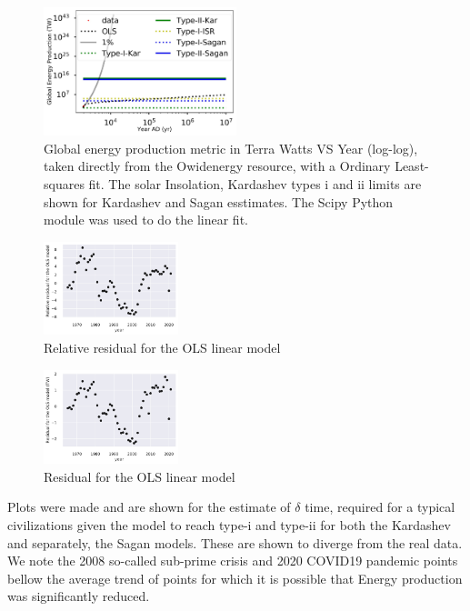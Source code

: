 \documentclass[final,5p,times,twocolumn,authoryear]{elsarticle}
\begin{document}
\begin{figure}
    \centering
    \includegraphics[width=0.5\textwidth]{figs/fig2_kar.jpg}
    \caption{Global energy production metric in Terra Watts VS Year (log-log), taken directly from the Owidenergy resource, with a Ordinary Least-squares fit. The solar Insolation, Kardashev types i and ii limits are shown for Kardashev and Sagan esstimates. The Scipy Python module was used to do the linear fit.}
    \label{fig:kardashev3}

\end{figure}

\begin{figure}
    \centering
    \includegraphics[width=0.35\textwidth]{figs/fig1p_kar_rel_res.jpg}
    \caption{Relative residual for the OLS
    linear model}
    \label{fig:kardashev1_rel_res}

\end{figure}

\begin{figure}
    \centering
    \includegraphics[width=0.35\textwidth]{figs/fig1p_kar_res.jpg}
    \caption{Residual for the OLS
    linear model}
    \label{fig:kardashev1_res}

\end{figure}

Plots were made and are shown for the estimate of $\delta$ time, required for a typical civilizations given the model to reach type-i and type-ii for both the Kardashev and separately, the Sagan models. These are shown to diverge from the real data. We note the 2008 so-called sub-prime crisis and 2020 COVID19 pandemic points bellow the average trend of points for which it is possible that Energy production was significantly reduced.
\end{document}
